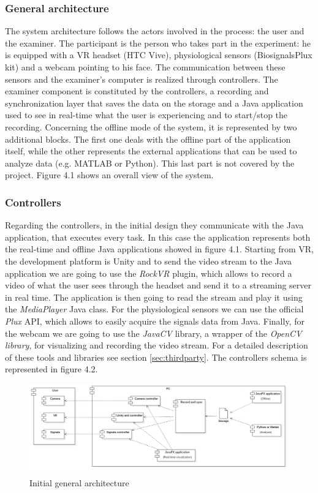 \documentclass[binding=0.6cm,LaM]{sapthesis}
\begin{document}
\subsubsection{General architecture}

The system architecture follows the actors involved in the process: the user and the examiner. The participant is the person who takes part in the experiment: he is equipped with a VR headset (HTC Vive), physiological sensors (BiosignalsPlux kit) and a webcam pointing to his face. The communication between these sensors and the examiner's computer is realized through controllers. The examiner component is constituted by the controllers, a recording and synchronization layer that saves the data on the storage and a Java application used to see in real-time what the user is experiencing and to start/stop the recording. 
Concerning the offline mode of the system, it is represented by two additional blocks. The first one deals with the offline part of the application itself, while the other represents the external applications that can be used to analyze data (e.g. MATLAB or Python). This last part is not covered by the project.
Figure 4.1 shows an overall view of the system.

\subsubsection{Controllers}

Regarding the controllers, in the initial design they communicate with the Java application, that executes every task.
In this case the application represents both the real-time and offline Java applications showed in figure 4.1.
Starting from VR, the development platform is Unity and to send the video stream to the Java application we are going to use the \textit{RockVR} plugin, which allows to record a video of what the user sees through the headset and send it to a streaming server in real time. The application is then going to read the stream and play it using the \textit{MediaPlayer} Java class. For the physiological sensors we can use the official \textit{Plux} API, which allows to easily acquire the signals data from Java.
Finally, for the webcam we are going to use the \textit{JavaCV} library, a wrapper of the \textit{OpenCV library}, for visualizing and recording the video stream. For a detailed description of these tools and libraries see section \ref{sec:thirdparty}. The controllers schema is represented in figure 4.2.

\begin{figure}
\centering
\includegraphics[scale=.5, angle=90]{images/general_schema}
\caption{Initial general architecture}
\end{figure}
\end{document}
